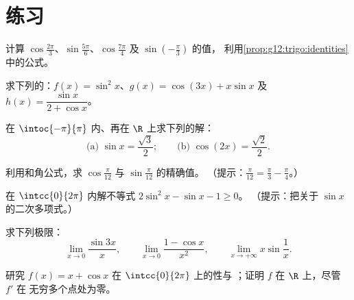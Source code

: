 \section{练习}

\begin{exercise}[$\star$]\label{exo:g12:trigo:1}
计算 $\cos\frac{2\pi}{3}$、$\sin\frac{5\pi}{6}$、$\cos\frac{7\pi}{4}$ 及
$\sin\left(-\frac{\pi}{3}\right)$ 的值，
利用\cref{prop:g12:trigo:identities}中的公式。
\end{exercise}

\begin{exercise}[$\star$]\label{exo:g12:trigo:2}
求下列的：$f(x) = \sin^2 x$、$g(x) = \cos(3x) + x\sin x$ 及
$h(x) = \dfrac{\sin x}{2 + \cos x}$。
\end{exercise}

\begin{exercise}[$\star$]\label{exo:g12:trigo:3}
在 $\intoc{-\pi}{\pi}$ 内、再在 $\R$ 上求下列的解：
\[
\text{(a) } \sin x = \frac{\sqrt3}{2};
\qquad
\text{(b) } \cos\left(2x\right) = \frac{\sqrt2}{2} .
\]
\end{exercise}

\begin{exercise}[$\star\star$]\label{exo:g12:trigo:4}
利用和角公式，求
$\cos\frac{\pi}{12}$ 与 $\sin\frac{\pi}{12}$ 的精确值。
（提示：$\frac{\pi}{12} = \frac{\pi}{3} - \frac{\pi}{4}$。）
\end{exercise}

\begin{exercise}[$\star\star$]\label{exo:g12:trigo:5}
在 $\intcc{0}{2\pi}$ 内解不等式 $2\sin^2 x - \sin x - 1 \geq 0$。
（提示：把关于 $\sin x$ 的二次多项式。）
\end{exercise}

\begin{exercise}[$\star\star$]\label{exo:g12:trigo:6}
求下列极限：
\[
\lim_{x\to0} \frac{\sin 3x}{x}, \qquad
\lim_{x\to0} \frac{1 - \cos x}{x^2}, \qquad
\lim_{x\to+\infty} x \sin\frac{1}{x}.
\]
\end{exercise}

\begin{exercise}[$\star\star$]\label{exo:g12:trigo:7}
研究 $f(x) = x + \cos x$ 在 $\intcc{0}{2\pi}$ 上的性与
；证明 $f$ 在 $\R$ 上，尽管 $f'$ 在
无穷多个点处为零。
\end{exercise}


